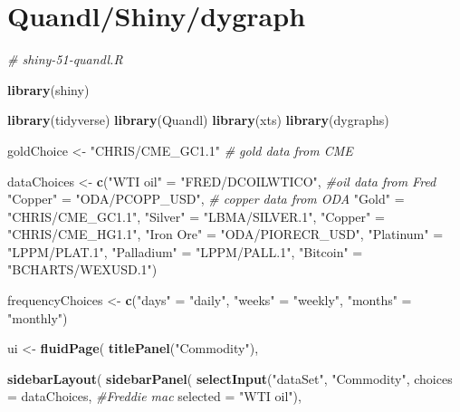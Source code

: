 \documentclass[]{article}
\newenvironment{Shaded}{\begin{snugshade}}{\end{snugshade}}
\newcommand{\CommentTok}[1]{\textcolor[rgb]{0.56,0.35,0.01}{\textit{#1}}}
\newcommand{\DataTypeTok}[1]{\textcolor[rgb]{0.13,0.29,0.53}{#1}}
\newcommand{\KeywordTok}[1]{\textcolor[rgb]{0.13,0.29,0.53}{\textbf{#1}}}
\newcommand{\NormalTok}[1]{#1}
\newcommand{\StringTok}[1]{\textcolor[rgb]{0.31,0.60,0.02}{#1}}
\begin{document}
\hypertarget{quandlshinydygraph}{%
\section{Quandl/Shiny/dygraph}\label{quandlshinydygraph}}

\begin{Shaded}
\begin{Highlighting}[]
\CommentTok{# shiny-51-quandl.R}

\KeywordTok{library}\NormalTok{(shiny)}

\KeywordTok{library}\NormalTok{(tidyverse) }
\KeywordTok{library}\NormalTok{(Quandl)}
\KeywordTok{library}\NormalTok{(xts)}
\KeywordTok{library}\NormalTok{(dygraphs)}

\NormalTok{goldChoice <-}\StringTok{ "CHRIS/CME_GC1.1"} \CommentTok{# gold data from CME}

\NormalTok{dataChoices <-}\StringTok{ }\KeywordTok{c}\NormalTok{(}\StringTok{"WTI oil"}\NormalTok{ =}\StringTok{ "FRED/DCOILWTICO"}\NormalTok{, }\CommentTok{#oil data from Fred}
                 \StringTok{"Copper"}\NormalTok{ =}\StringTok{ "ODA/PCOPP_USD"}\NormalTok{, }\CommentTok{# copper data from ODA}
                 \StringTok{"Gold"}\NormalTok{ =}\StringTok{ "CHRIS/CME_GC1.1"}\NormalTok{,}
                 \StringTok{"Silver"}\NormalTok{ =}\StringTok{ "LBMA/SILVER.1"}\NormalTok{,}
                 \StringTok{"Copper"}\NormalTok{ =}\StringTok{ "CHRIS/CME_HG1.1"}\NormalTok{,}
                 \StringTok{"Iron Ore"}\NormalTok{ =}\StringTok{ "ODA/PIORECR_USD"}\NormalTok{,}
                 \StringTok{"Platinum"}\NormalTok{ =}\StringTok{ "LPPM/PLAT.1"}\NormalTok{,}
                 \StringTok{"Palladium"}\NormalTok{ =}\StringTok{ "LPPM/PALL.1"}\NormalTok{,}
                 \StringTok{"Bitcoin"}\NormalTok{ =}\StringTok{ "BCHARTS/WEXUSD.1"}\NormalTok{)}

\NormalTok{frequencyChoices <-}\StringTok{ }\KeywordTok{c}\NormalTok{(}\StringTok{"days"}\NormalTok{ =}\StringTok{ "daily"}\NormalTok{,}
                      \StringTok{"weeks"}\NormalTok{ =}\StringTok{ "weekly"}\NormalTok{, }
                      \StringTok{"months"}\NormalTok{ =}\StringTok{ "monthly"}\NormalTok{)}

\NormalTok{ui <-}\StringTok{ }\KeywordTok{fluidPage}\NormalTok{(}
  \KeywordTok{titlePanel}\NormalTok{(}\StringTok{"Commodity"}\NormalTok{),}
  
  \KeywordTok{sidebarLayout}\NormalTok{(}
    \KeywordTok{sidebarPanel}\NormalTok{(}
      \KeywordTok{selectInput}\NormalTok{(}\StringTok{"dataSet"}\NormalTok{,}
                  \StringTok{"Commodity"}\NormalTok{,}
                  \DataTypeTok{choices =}\NormalTok{ dataChoices, }\CommentTok{#Freddie mac}
                  \DataTypeTok{selected =} \StringTok{"WTI oil"}\NormalTok{),}
      

\end{Highlighting}
\end{Shaded}
\end{document}
